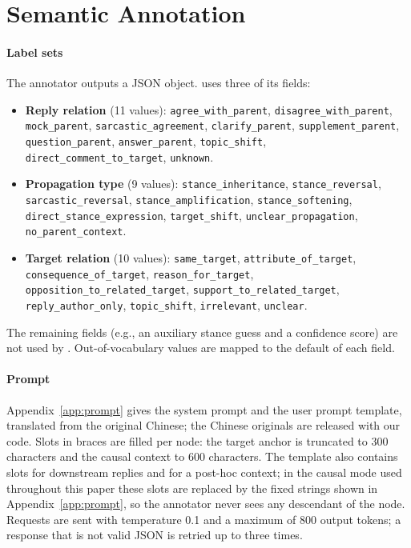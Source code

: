 \section{Semantic Annotation}
\label{app:annotation}

\paragraph{Label sets}
The annotator outputs a JSON object. \spin{} uses three of its fields:
\begin{itemize}
  \setlength\itemsep{0pt}
  \item \textbf{Reply relation} (11 values): \texttt{agree\_with\_parent}, \texttt{disagree\_with\_parent}, \texttt{mock\_parent}, \texttt{sarcastic\_agreement}, \texttt{clarify\_parent}, \texttt{supplement\_parent}, \texttt{question\_parent}, \texttt{answer\_parent}, \texttt{topic\_shift}, \texttt{direct\_comment\_to\_target}, \texttt{unknown}.
  \item \textbf{Propagation type} (9 values): \texttt{stance\_inheritance}, \texttt{stance\_reversal}, \texttt{sarcastic\_reversal}, \texttt{stance\_amplification}, \texttt{stance\_softening}, \texttt{direct\_stance\_expression}, \texttt{target\_shift}, \texttt{unclear\_propagation}, \texttt{no\_parent\_context}.
  \item \textbf{Target relation} (10 values): \texttt{same\_target}, \texttt{attribute\_of\_target}, \texttt{consequence\_of\_target}, \texttt{reason\_for\_target}, \texttt{opposition\_to\_related\_target}, \texttt{support\_to\_related\_target}, \texttt{reply\_author\_only}, \texttt{topic\_shift}, \texttt{irrelevant}, \texttt{unclear}.
\end{itemize}
The remaining fields (e.g., an auxiliary stance guess and a confidence score) are not used by \spin{}. Out-of-vocabulary values are mapped to the default of each field.

\paragraph{Prompt}
Appendix~\ref{app:prompt} gives the system prompt and the user prompt template, translated from the original Chinese; the Chinese originals are released with our code. Slots in braces are filled per node: the target anchor is truncated to 300 characters and the causal context to 600 characters. The template also contains slots for downstream replies and for a post-hoc context; in the causal mode used throughout this paper these slots are replaced by the fixed strings shown in Appendix~\ref{app:prompt}, so the annotator never sees any descendant of the node. Requests are sent with temperature 0.1 and a maximum of 800 output tokens; a response that is not valid JSON is retried up to three times.

